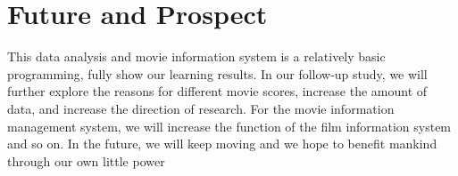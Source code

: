 \documentclass[conference]{IEEEtran}
\begin{document}
\section{Future and Prospect}
This data analysis and movie information system is a relatively basic programming, fully show our learning results. In our follow-up study, we will further explore the reasons for different movie scores, increase the amount of data, and increase the direction of research. For the movie information management system, we will increase the function of the film information system and so on. In the future, we will keep moving and we hope to benefit mankind through our own little power
\end{document}
